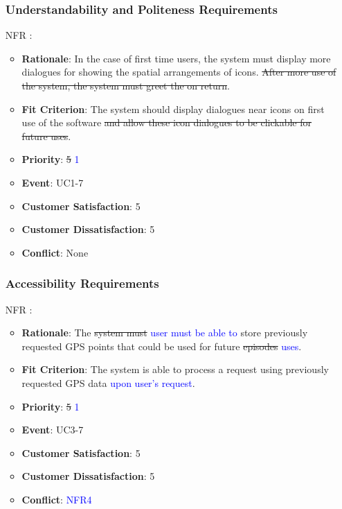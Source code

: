\documentclass[12pt, titlepage]{article}
\newcounter{reqnum} %
\newcounter{freqnum} %
\begin{document}
\begin{itemize}
\subsubsection{Understandability and Politeness Requirements}
\item[NFR\refstepcounter{freqnum}\thefreqnum
\label{NFR}:] 
\begin{itemize}
    \item \textbf{Rationale}: In the case of first time users, the system must display more dialogues for showing the spatial arrangements of icons. \sout{After more use of the system, the system must greet the on return}.
    \item \textbf{Fit Criterion}: The system should display dialogues near icons on first use of the software\sout{ and allow these icon dialogues to be clickable for future uses}. 
    \item \textbf{Priority}: \sout{5} \textcolor{blue}{1}
    \item \textbf{Event}: UC1-7%
    \item \textbf{Customer Satisfaction}: 5
    \item \textbf{Customer Dissatisfaction}: 5
    \item \textbf{Conflict}: None
\end{itemize}
\subsubsection{Accessibility Requirements}
\item[NFR\refstepcounter{freqnum}\thefreqnum
\label{NFR}:] 
\begin{itemize}
    \item \textbf{Rationale}: The \sout{system must} \textcolor{blue}{user must be able to} store previously requested GPS points that could be used for future \sout{episodes} \textcolor{blue}{uses}.
    \item \textbf{Fit Criterion}: The system is able to process a request using previously requested GPS data \textcolor{blue}{upon user's request}.
    \item \textbf{Priority}: \sout{5} \textcolor{blue}{1}
    \item \textbf{Event}: UC3-7%
    \item \textbf{Customer Satisfaction}: 5
    \item \textbf{Customer Dissatisfaction}: 5
    \item \textbf{Conflict}: \textcolor{blue}{NFR4}
\end{itemize}

\end{itemize}
\end{document}
